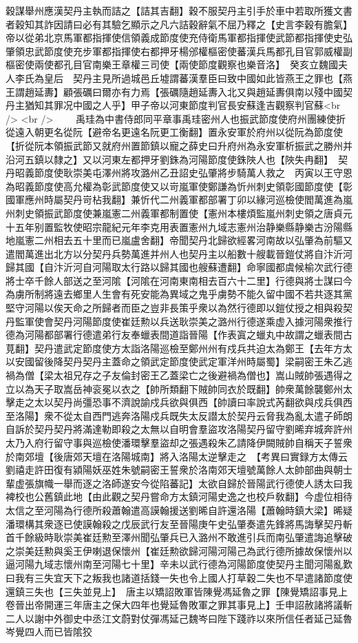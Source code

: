 穀謀舉州應漢契丹主執而詰之【詰其吉翻】穀不服契丹主引手於車中若取所獲文書者穀知其詐因請曰必有其驗乞顯示之凡六詰穀辭氣不屈乃釋之【史言李穀有膽氣】　帝以從弟北京馬軍都指揮使信領義成節度使充侍衛馬軍都指揮使武節都指揮使史弘肇領忠武節度使充步軍都指揮使右都押牙楊邠權樞密使蕃漢兵馬都孔目官郭威權副樞密使兩使都孔目官南樂王章權三司使【兩使節度觀察也樂音洛】　癸亥立魏國夫人李氏為皇后　契丹主見所過城邑丘墟謂蕃漢羣臣曰致中國如此皆燕王之罪也【燕王謂趙延夀】顧張礪曰爾亦有力焉【張礪隨趙延夀入北又與趙延夀俱南以殘中國契丹主猶知其罪况中國之人乎】甲子帝以河東節度判官長安蘇逢吉觀察判官蘇<br />
<br />
　　禹珪為中書侍郎同平章事禹珪密州人也振武節度使府州團練使折從遠入朝更名從阮【避帝名更遠名阮更工衡翻】置永安軍於府州以從阮為節度使【折從阮本領振武節又就府州置節鎮以寵之薛史曰升府州為永安軍析振武之勝州并沿河五鎮以隸之】又以河東左都押牙劉銖為河陽節度使銖陜人也【陜失冉翻】　契丹昭義節度使耿崇美屯澤州將攻潞州乙丑詔史弘肇將步騎萬人救之　丙寅以王守恩為昭義節度使高允權為彰武節度使又以岢嵐軍使鄭謙為忻州刺史領彰國節度使【彰國軍應州時屬契丹岢枮我翻】兼忻代二州義軍都部署丁卯以緣河巡檢使閻萬進為嵐州刺史領振武節度使兼嵐憲二州義軍都制置使【憲州本樓煩監嵐州刺史領之唐貞元十五年别置監牧使昭宗龍紀元年李克用表置憲州九域志憲州治静樂縣静樂古汾陽縣地嵐憲二州相去五十里而已嵐盧舍翻】帝聞契丹北歸欲經畧河南故以弘肇為前驅又遣閻萬進出北方以分契丹兵勢萬進并州人也契丹主以船數十艘載晉鎧仗將自汴沂河歸其國【自汴沂河自河陽取太行路以歸其國也艘蘇遭翻】命寧國都虞候榆次武行德將士卒千餘人部送之至河隂【河隂在河南東南相去百六十二里】行德與將士謀曰今為虜所制將遠去鄉里人生會有死安能為異域之鬼乎虜勢不能久留中國不若共逐其黨堅守河陽以俟天命之所歸者而臣之豈非長策乎衆以為然行德即以鎧仗授之相與殺契丹監軍使會契丹河陽節度使崔廷勲以兵送耿崇美之潞州行德遂乘虚入據河陽衆推行德為河陽都部署行德遣弟行友奉蠟表間道詣晉陽【作表寘之蠟丸中故謂之蠟表間古莧翻】契丹遣武定節度使方太詣洛陽巡檢至鄭州州有戍兵共迫太為鄭王【去年方太以安國留後降契丹契丹主蓋命之領武定節度使武定軍洋州時屬蜀】梁嗣密王朱乙逃禍為僧【梁太祖兄存之子友倫封密王乙蓋梁亡之後避禍為僧也】嵩山賊帥張遇得之立以為天子取嵩岳神衮冕以衣之【帥所類翻下賊帥同衣於既翻】帥衆萬餘襲鄭州太擊走之太以契丹尚彊恐事不濟說諭戍兵欲與俱西【帥讀曰率說式芮翻欲與戍兵俱西至洛陽】衆不從太自西門逃奔洛陽戍兵既失太反譛太於契丹云脅我為亂太遣子師朗自訴於契丹契丹將滿達勒即殺之太無以自明會羣盜攻洛陽契丹留守劉晞弃城奔許州太乃入府行留守事與巡檢使潘環擊羣盜却之張遇殺朱乙請降伊闕賊帥自稱天子誓衆於南郊壇【後唐郊天壇在洛陽城南】將入洛陽太逆擊走之　【考異曰實録方太傳云劉禧走許田復有潁陽妖巫姓朱號嗣密王誓衆於洛南郊天壇號萬餘人太帥部曲與朝士輩虚張旗幟一舉而逐之洛師遂安今從陷蕃記】太欲自歸於晉陽武行德使人誘太曰我裨校也公舊鎮此地【由此觀之契丹嘗命方太鎮河陽史逸之也校戶敎翻】今虚位相待太信之至河陽為行德所殺蕭翰遣高謨翰援送劉晞自許還洛陽【蕭翰時鎮大梁】晞疑潘環構其衆逐已使謨翰殺之戊辰武行友至晉陽庚午史弘肇奏遣先鋒將馬誨擊契丹斬首千餘級時耿崇美崔廷勲至澤州聞弘肇兵已入潞州不敢進引兵而南弘肇遣誨追擊破之崇美廷勲與奚王伊喇退保懷州【崔廷勲欲歸河陽河陽己為武行德所據故保懷州以逼河陽九域志懷州南至河陽七十里】辛未以武行德為河陽節度使契丹主聞河陽亂歎曰我有三失宜天下之叛我也諸道括錢一失也令上國人打草穀二失也不早遣諸節度使還鎮三失也【三失並見上】　唐主以矯詔敗軍皆陳覺馮延魯之罪【陳覺矯詔事見上卷晉出帝開運三年唐主之保大四年也覺延魯敗軍之罪其事見上】壬申詔赦諸將議斬二人以謝中外御史中丞江文蔚對仗彈馮延己魏岑曰陛下踐祚以來所信任者延己延魯岑覺四人而已皆隂狡